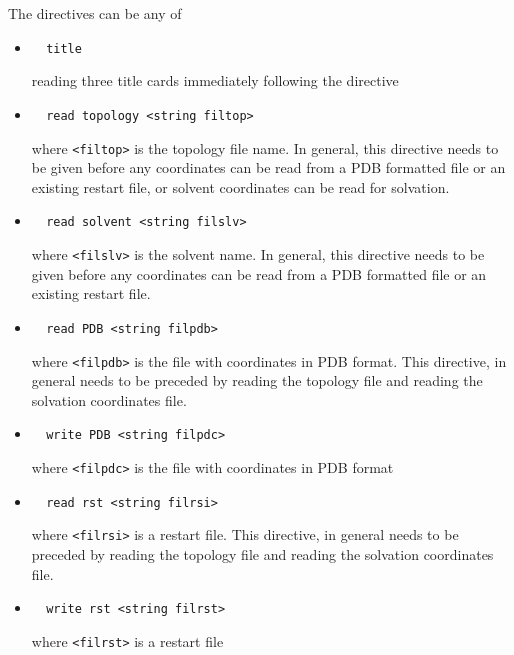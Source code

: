 The directives can be any of
\begin{itemize}

\item
\begin{verbatim}
  title
\end{verbatim}
reading three title cards immediately following the directive

\item
\begin{verbatim}
  read topology <string filtop>
\end{verbatim}
where \verb+<filtop>+ is the topology file name. In general, this
directive needs to be given before any coordinates can be read from a
PDB formatted file or an existing restart file, or solvent coordinates
can be read for solvation.

\item
\begin{verbatim}
  read solvent <string filslv>
\end{verbatim}
where \verb+<filslv>+ is the solvent name. In general, this directive
needs to be given before any coordinates can be read from a PDB
formatted file or an existing restart file.

\item
\begin{verbatim}
  read PDB <string filpdb>
\end{verbatim}
where \verb+<filpdb>+ is the file with coordinates in PDB format. This
directive, in general needs to be preceded by reading the topology
file and reading the solvation coordinates file.

\item
\begin{verbatim}
  write PDB <string filpdc>
\end{verbatim}
where \verb+<filpdc>+ is the file with coordinates in PDB format

\item
\begin{verbatim}
  read rst <string filrsi>
\end{verbatim}
where \verb+<filrsi>+ is a restart file. This directive, in general needs
to be preceded by reading the topology file and reading the solvation
coordinates file.

\item
\begin{verbatim}
  write rst <string filrst>
\end{verbatim}
where \verb+<filrst>+ is a restart file


\end{itemize}
